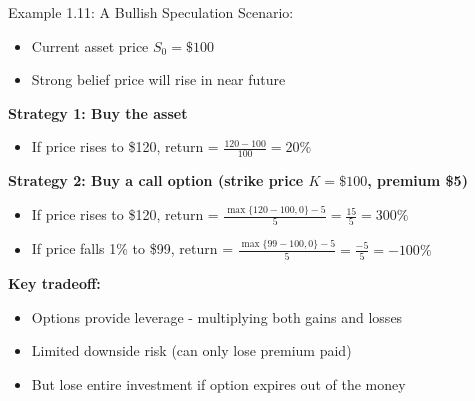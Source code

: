 \documentclass[10pt]{beamer}
\begin{document}
\begin{frame}{Example 1.11: A Bullish Speculation}
  Scenario:
  \begin{itemize}
    \item Current asset price $S_0 = \$100$
    \item Strong belief price will rise in near future
  \end{itemize}
  
  \pause
  \textbf{Strategy 1: Buy the asset}
  \begin{itemize}
    \item If price rises to \$120, return = $\tfrac{120 - 100}{100} = 20\%$
  \end{itemize}
  
  \pause
  \textbf{Strategy 2: Buy a call option (strike price $K = \$100$, premium \$5)}
  \begin{itemize}
    \item If price rises to \$120, return = $\tfrac{\max\{120 - 100, 0\} - 5}{5} = \tfrac{15}{5} = 300\%$
    \item If price falls 1\% to \$99, return = $\tfrac{\max\{99 - 100, 0\} - 5}{5} = \tfrac{-5}{5} = -100\%$
  \end{itemize}
  
  \pause
  \textbf{Key tradeoff:}
  \begin{itemize}
    \item Options provide leverage - multiplying both gains and losses
    \item Limited downside risk (can only lose premium paid)
    \item But lose entire investment if option expires out of the money
  \end{itemize}
\end{frame}
\end{document}
